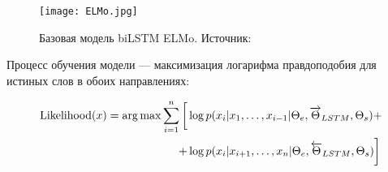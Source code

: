 \begin{figure}[ht]
    \centering
    \texttt{[image: ELMo.jpg]}
    \caption{Базовая модель biLSTM ELMo. Источник: \cite{elmopic}}
    \label{fig:elmo}
\end{figure}

\bigskip
Процесс обучения модели --- максимизация логарифма правдоподобия для истиных слов в обоих направлениях:

\begin{equation*}
\begin{aligned}
 \operatorname*{Likelihood} (x) = \operatorname*{arg\,max} \sum_{i=1}^n \bigg[ & \log p(x_i| x_1, \ldots, x_{i-1}|\Theta_e,\overrightarrow{\Theta}_{LSTM}, \Theta_s) + \\
 + & \log p(x_i| x_{i+1}, \ldots, x_n| \Theta_e,\overleftarrow{\Theta}_{LSTM}, \Theta_s)\bigg]
\end{aligned}
\end{equation*}






